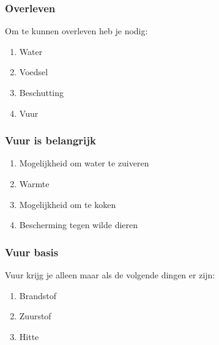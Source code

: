 \documentclass[a4paper, handout]{beamer}
\begin{document}
\begin{frame}
	\frametitle{Overleven}
	Om te kunnen overleven heb je nodig:
	\begin{enumerate}
		\item{Water}
		\item{Voedsel}
		\item{Beschutting}
		\item{Vuur}
	\end{enumerate}
\end{frame}

\begin{frame}
	\frametitle{Vuur is belangrijk}
	\begin{enumerate}
		\item{Mogelijkheid om water te zuiveren}
		\item{Warmte}
		\item{Mogelijkheid om te koken}
		\item{Bescherming tegen wilde dieren}
	\end{enumerate}
\end{frame}

\begin{frame}
	\frametitle{Vuur basis}
	Vuur krijg je alleen maar als de volgende dingen er zijn:
	\begin{enumerate}
		\item{Brandstof}
		\item{Zuurstof}
		\item{Hitte}
	\end{enumerate}
\end{frame}
\end{document}
